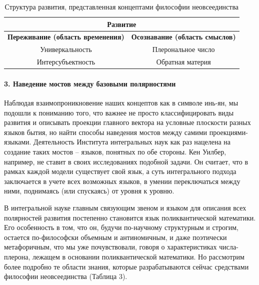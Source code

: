     \begin{table}[ht!]
    \centering
    \caption{Структура развития, представленная концептами философии неовсеединства}
    \begin{tabular}{|c|c|}
    \hline
    \multicolumn{2}{|c|}{\textbf{Развитие}} \\
    \hline
    \textbf{Переживание (область временения)} & \textbf{Осознавание (область смыслов)} \\
    \hline
    Универкальность & Плерональное число \\
    \hline
    Интерсубъектность & Обратная материя \\
    \hline
    \end{tabular}
    \end{table}

    \paragraph*{3. Наведение мостов между базовыми полярностями}
    Наблюдая взаимопроникновение наших концептов как в символе инь-ян, мы подошли к пониманию того, что важнее не просто классифицировать виды развития и описывать проекции главного вектора на условные плоскости разных языков бытия, но найти способы наведения мостов между самими проекциями-языками. Деятельность Института интегральных наук как раз нацелена на создание таких мостов – языков, понятных по обе стороны. Кен Уилбер, например, не ставит в своих исследованиях подобной задачи. Он считает, что в рамках каждой модели существует свой язык, а суть интегрального подхода заключается в учете всех возможных языков, в умении переключаться между ними, поднимаясь (или спускаясь) от уровня к уровню.

    В интегральной науке главным связующим звеном и языком для описания всех полярностей развития постепенно становится язык поликвантической математики. Его особенность в том, что он, будучи по-научному структурным и строгим, остается по-философски объемным и антиномичным, и даже поэтически метафоричным, что мы уже почувствовали, говоря о характеристиках числа-плерона, лежащем в основании поликвантической математики. Но рассмотрим более подробно те области знания, которые разрабатываются сейчас средствами философии неовсеединства (Таблица 3).

